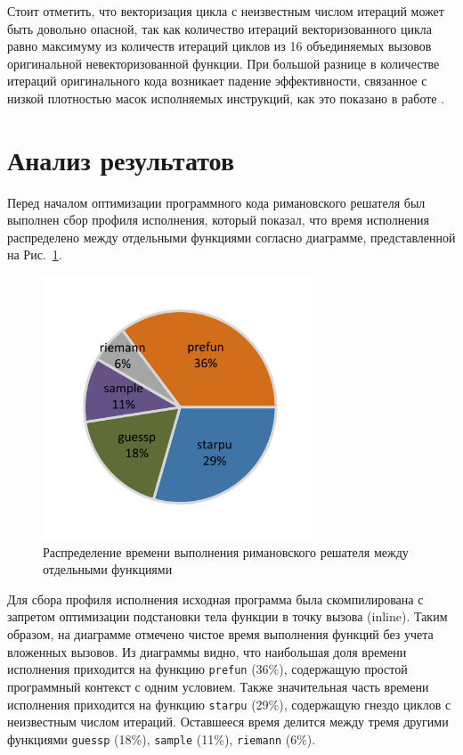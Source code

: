 \documentclass[utf8]{psta}
\begin{document}
Стоит отметить, что векторизация цикла с неизвестным числом итераций может быть довольно опасной, так как количество итераций векторизованного цикла равно максимуму из количеств итераций циклов из 16 объединяемых вызовов оригинальной невекторизованной функции.
При большой разнице в количестве итераций оригинального кода возникает падение эффективности, связанное с низкой плотностью масок исполняемых инструкций, как это показано в работе \cite{RybTelShabLoopsVect}.

\section{Анализ результатов}

Перед началом оптимизации программного кода римановского решателя был выполнен сбор профиля исполнения, который показал, что время исполнения распределено между отдельными функциями согласно диаграмме, представленной на Рис.~\ref{pic:exe_prof}.

\begin{figure}
\includegraphics[width=8cm]{pics/pic_exe_prof}
\caption{Распределение времени выполнения римановского решателя между отдельными функциями}
\label{pic:exe_prof}
\end{figure}

Для сбора профиля исполнения исходная программа была скомпилирована с запретом оптимизации подстановки тела функции в точку вызова (inline).
Таким образом, на диаграмме отмечено чистое время выполнения функций без учета вложенных вызовов.
Из диаграммы видно, что наибольшая доля времени исполнения приходится на функцию \texttt{prefun} (36\%), содержащую простой программный контекст с одним условием.
Также значительная часть времени исполнения приходится на функцию \texttt{starpu} (29\%), содержащую гнездо циклов с неизвестным числом итераций.
Оставшееся время делится между тремя другими функциями \texttt{guessp} (18\%), \texttt{sample} (11\%), \texttt{riemann} (6\%).
\end{document}
